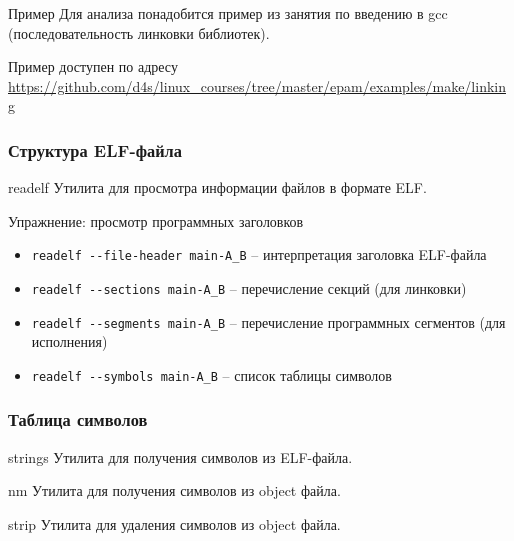 \begin{frame}
	\frametitle{}

	\begin{block}{Пример}
		Для анализа понадобится пример из занятия по введению в gcc (последовательность линковки библиотек).
	\end{block}

	Пример доступен по адресу \url{https://github.com/d4s/linux\_courses/tree/master/epam/examples/make/linking}
	
\end{frame}

\begin{frame}
	\frametitle{Структура ELF-файла}

	\begin{block}{readelf}
		Утилита для просмотра информации файлов в формате ELF.
	\end{block}

	\pause

	\begin{block}{Упражнение: просмотр программных заголовков}
		\begin{itemize}
			\item {\tt readelf -{}-file-header main-A\_B} -- интерпретация заголовка ELF-файла
			\item {\tt readelf -{}-sections main-A\_B} -- перечисление секций (для линковки)
			\item {\tt readelf -{}-segments main-A\_B} -- 
				перечисление программных сегментов (для исполнения)
			\item {\tt readelf -{}-symbols main-A\_B} -- список таблицы символов
		\end{itemize}
	\end{block}
\end{frame}

\begin{frame}
	\frametitle{Таблица символов}

	\begin{block}{strings}
		Утилита для получения символов из ELF-файла.
	\end{block}

	\begin{block}{nm}
		Утилита для получения символов из object файла.
	\end{block}

	\begin{block}{strip}
		Утилита для удаления символов из object файла.
	\end{block}
\end{frame}

